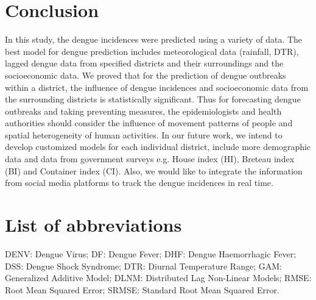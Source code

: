 \documentclass{bmcart}
\begin{document}
%
%


\section{Conclusion} \label{conclusion}


In this study, the dengue incidences were predicted using a variety of data. The best model for dengue prediction includes meteorological data (rainfall, DTR), lagged dengue data from specified districts and their surroundings and the socioeconomic data. We proved that for the prediction of dengue outbreaks within a district, the influence of dengue incidences and socioeconomic data from the surrounding districts is statistically significant. Thus for forecasting dengue outbreaks and taking preventing measures, the epidemiologists and health authorities should consider the influence of movement patterns of people and spatial heterogeneity of human activities. In our future work, we intend to develop customized models for each individual district, include more demographic data and data from government surveys e.g. House index (HI), Breteau index (BI) and Container index (CI). Also, we would like to integrate the information from social media platforms to track the dengue incidences in real time. 

\section*{List of abbreviations}
DENV: Dengue Virus; DF: Dengue Fever; DHF: Dengue Haemorrhagic Fever; DSS: Dengue Shock Syndrome; DTR: Diurnal Temperature Range; GAM: Generalized Additive Model; DLNM: Distributed Lag Non-Linear Models; RMSE: Root Mean Squared Error; SRMSE: Standard Root Mean Squared Error. 





\clearpage %




\end{document}
